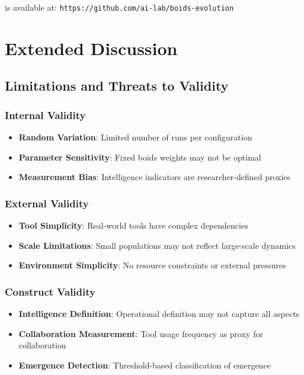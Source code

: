 \documentclass[10pt]{article}
\begin{document}
is available at: \texttt{https://github.com/ai-lab/boids-evolution}

\section{Extended Discussion}

\subsection{Limitations and Threats to Validity}

\subsubsection{Internal Validity}
\begin{itemize}
\item \textbf{Random Variation}: Limited number of runs per configuration
\item \textbf{Parameter Sensitivity}: Fixed boids weights may not be optimal
\item \textbf{Measurement Bias}: Intelligence indicators are researcher-defined proxies
\end{itemize}

\subsubsection{External Validity}
\begin{itemize}
\item \textbf{Tool Simplicity}: Real-world tools have complex dependencies
\item \textbf{Scale Limitations}: Small populations may not reflect large-scale dynamics
\item \textbf{Environment Simplicity}: No resource constraints or external pressures
\end{itemize}

\subsubsection{Construct Validity}
\begin{itemize}
\item \textbf{Intelligence Definition}: Operational definition may not capture all aspects
\item \textbf{Collaboration Measurement}: Tool usage frequency as proxy for collaboration
\item \textbf{Emergence Detection}: Threshold-based classification of emergence
\end{itemize}
\end{document}
